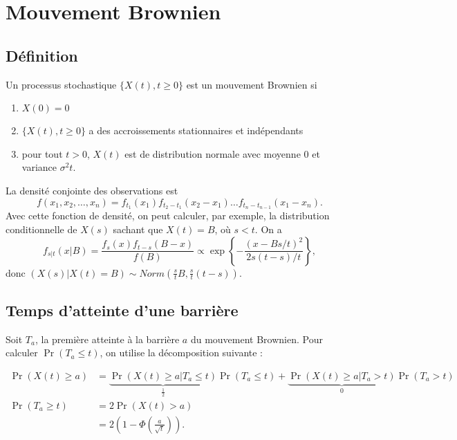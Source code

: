 \chapter{Mouvement Brownien}\label{ch:brownien}

\section{Définition}

\begin{definition}{}{}
	Un processus stochastique $\{X(t), t\geq 0\}$ est un mouvement Brownien si 
	\begin{enumerate}
		\item $X(0) = 0$
		\item $\{X(t), t\geq 0\}$ a des accroissements stationnaires et indépendants
		\item pour tout $t>0$, $X(t)$ est de distribution normale avec moyenne 0 et variance $\sigma^2 t$.
	\end{enumerate}
\end{definition}

La densité conjointe des observations est 
$$f(x_1, x_2, \dots, x_n) = f_{t_1}(x_1)f_{t_2 - t_1}(x_2 - x_1) \dots f_{t_n - t_{n-1}}(x_1 - x_n).$$
Avec cette fonction de densité, on peut calculer, par exemple, la distribution conditionnelle de $X(s)$ sachant que $X(t) = B$, où $s<t$. On a 
$$f_{s\vert t}(x \vert B) = \frac{f_{s}(x) f_{t-s}(B - x)}{f(B)} \propto \exp\left\{-\frac{(x - Bs/t)^2}{2s(t-s)/t}\right\},$$
donc $(X(s) \vert X(t) = B) \sim Norm\left(\frac{s}{t}B, \frac{s}{t}(t-s)\right)$. 

\section{Temps d'atteinte d'une barrière}

Soit $T_a$, la première atteinte à la barrière $a$ du mouvement Brownien. Pour calculer $\Pr(T_a \leq t)$, on utilise la décomposition suivante : 

\begin{align*}
\Pr(X(t) \geq a) &= \underbrace{\Pr(X(t) \geq a \vert T_a \leq t)}_{\frac{1}{2}} \Pr(T_a \leq t) + \underbrace{\Pr(X(t) \geq a \vert T_a > t)}_{0} \Pr(T_a > t)\\
\Pr(T_a \geq t) &= 2\Pr(X(t) > a)\\
&= 2\left(1 - \Phi \left(\frac{a}{\sqrt{t}}\right)\right).
\end{align*}

